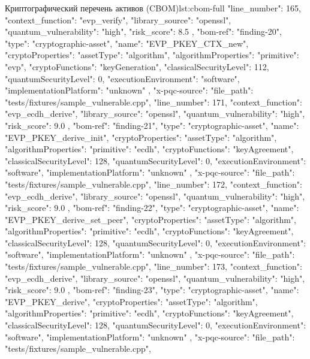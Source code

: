 \documentclass{itmo-vkr}
\begin{document}
\begin{itmolisting}[JSON]{Криптографический перечень активов (CBOM)}{lst:cbom-full}
{{{				"line_number": 165,
				"context_function": "evp_verify",
				"library_source": "openssl",
				"quantum_vulnerability": "high",
				"risk_score": 8.5
			}
		},
		{
			"bom-ref": "finding-20",
			"type": "cryptographic-asset",
			"name": "EVP_PKEY_CTX_new",
			"cryptoProperties": {
				"assetType": "algorithm",
				"algorithmProperties": {
					"primitive": "evp",
					"cryptoFunctions": "keyGeneration",
					"classicalSecurityLevel": 112,
					"quantumSecurityLevel": 0,
					"executionEnvironment": "software",
					"implementationPlatform": "unknown"
				}
			},
			"x-pqc-source": {
				"file_path": "tests/fixtures/sample_vulnerable.cpp",
				"line_number": 171,
				"context_function": "evp_ecdh_derive",
				"library_source": "openssl",
				"quantum_vulnerability": "high",
				"risk_score": 9.0
			}
		},
		{
			"bom-ref": "finding-21",
			"type": "cryptographic-asset",
			"name": "EVP_PKEY_derive_init",
			"cryptoProperties": {
				"assetType": "algorithm",
				"algorithmProperties": {
					"primitive": "ecdh",
					"cryptoFunctions": "keyAgreement",
					"classicalSecurityLevel": 128,
					"quantumSecurityLevel": 0,
					"executionEnvironment": "software",
					"implementationPlatform": "unknown"
				}
			},
			"x-pqc-source": {
				"file_path": "tests/fixtures/sample_vulnerable.cpp",
				"line_number": 172,
				"context_function": "evp_ecdh_derive",
				"library_source": "openssl",
				"quantum_vulnerability": "high",
				"risk_score": 9.0
			}
		},
		{
			"bom-ref": "finding-22",
			"type": "cryptographic-asset",
			"name": "EVP_PKEY_derive_set_peer",
			"cryptoProperties": {
				"assetType": "algorithm",
				"algorithmProperties": {
					"primitive": "ecdh",
					"cryptoFunctions": "keyAgreement",
					"classicalSecurityLevel": 128,
					"quantumSecurityLevel": 0,
					"executionEnvironment": "software",
					"implementationPlatform": "unknown"
				}
			},
			"x-pqc-source": {
				"file_path": "tests/fixtures/sample_vulnerable.cpp",
				"line_number": 173,
				"context_function": "evp_ecdh_derive",
				"library_source": "openssl",
				"quantum_vulnerability": "high",
				"risk_score": 9.0
			}
		},
		{
			"bom-ref": "finding-23",
			"type": "cryptographic-asset",
			"name": "EVP_PKEY_derive",
			"cryptoProperties": {
				"assetType": "algorithm",
				"algorithmProperties": {
					"primitive": "ecdh",
					"cryptoFunctions": "keyAgreement",
					"classicalSecurityLevel": 128,
					"quantumSecurityLevel": 0,
					"executionEnvironment": "software",
					"implementationPlatform": "unknown"
				}
			},
			"x-pqc-source": {
				"file_path": "tests/fixtures/sample_vulnerable.cpp",
}}}
\end{itmolisting}
\end{document}
